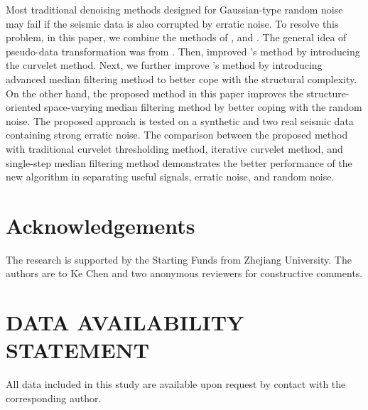 Most traditional denoising methods designed for Gaussian-type random noise may fail if the seismic data is also corrupted by erratic noise. To resolve this problem, in this paper, we combine the methods of \cite{wong2017matrix}, \cite{zhaoqiang2018} and \cite{sosvmf}. The general idea of pseudo-data transformation was from \cite{wong2017matrix}. Then, \cite{zhaoqiang2018} improved \cite{wong2017matrix}'s method by introducing the curvelet method. Next, we further improve \cite{zhaoqiang2018}'s method by introducing  advanced median filtering method  to better cope with the structural complexity. On the other hand, the proposed method in this paper improves the structure-oriented space-varying median filtering method \cite[]{sosvmf} by better coping with the random noise. The proposed approach is tested on a synthetic and two real seismic data containing strong erratic noise. The comparison between the proposed method with traditional curvelet thresholding method, iterative curvelet method, and single-step median filtering method demonstrates the better performance of the new algorithm in separating useful signals, erratic noise, and random noise.



\section{Acknowledgements}
The research is supported by the Starting Funds from Zhejiang University. The authors are  to Ke Chen and two anonymous reviewers for constructive comments.

\section{DATA AVAILABILITY STATEMENT}
All data included in this study are available upon request by contact with the corresponding author.










